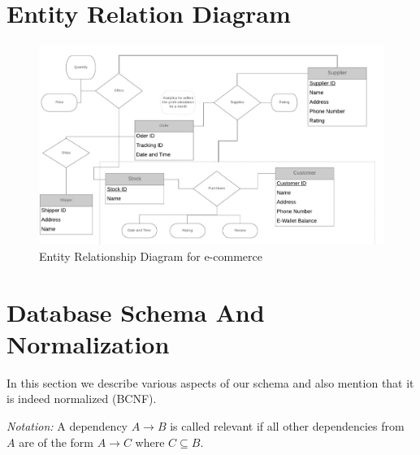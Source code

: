 \documentclass[a4paper,12pt]{article}
\newcommand{\ita}[1]{
    \textit{#1}
}
\begin{document}
\section{Entity Relation Diagram}
\begin{figure}[H]
    \centering
    \includegraphics[width=1\textwidth]{ERD2} 
    \caption{Entity Relationship Diagram for e-commerce}
\end{figure}
\section{Database Schema And Normalization}
In this section we describe various aspects of our schema and also mention that it is indeed normalized (BCNF).

\ita{Notation: }A dependency $A \rightarrow B$ is called relevant if all other dependencies from $A$ are of the form $A \rightarrow C$ where $C \subseteq B$.
\end{document}
